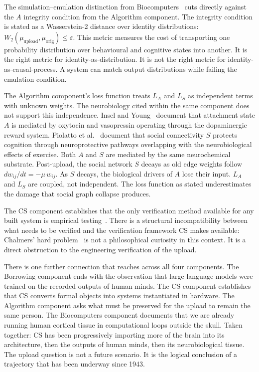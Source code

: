 \documentclass[12pt, a4paper]{article}
\begin{document}
The simulation--emulation distinction from Biocomputers~\cite{Bio-8} cuts directly against the $A$
integrity condition from the Algorithm component. The integrity condition is stated as a
Wasserstein-2 distance over identity distributions: $W_2(\mu_{\mathrm{upload}},\mu_{\mathrm{orig}})
\leq \varepsilon$. This metric measures the cost of transporting one probability distribution over
behavioural and cognitive states into another. It is the right metric for identity-as-distribution.
It is not the right metric for identity-as-causal-process. A system can match output distributions
while failing the emulation condition.

The Algorithm component's loss function treats $L_A$ and $L_S$ as independent terms with unknown
weights. The neurobiology cited within the same component does not support this independence. Insel
and Young~\cite{Alg-2} document that attachment state $A$ is mediated by oxytocin and vasopressin
operating through the dopaminergic reward system. Piolatto et al.~\cite{Alg-10} document that social
connectivity $S$ protects cognition through neuroprotective pathways overlapping with the
neurobiological effects of exercise. Both $A$ and $S$ are mediated by the same neurochemical
substrate. Post-upload, the social network $S$ decays as old edge weights follow $dw_{ij}/dt =
-\mu\,w_{ij}$. As $S$ decays, the biological drivers of $A$ lose their input. $L_A$ and $L_S$ are
coupled, not independent. The loss function as stated underestimates the damage that social graph
collapse produces.

The CS component establishes that the only verification method available for any built system is
empirical testing~\cite{Bor-6}. There is a structural incompatibility between what needs to be
verified and the verification framework CS makes available: Chalmers' hard problem~\cite{Alg-7} is
not a philosophical curiosity in this context. It is a direct obstruction to the engineering
verification of the upload.

There is one further connection that reaches across all four components. The Borrowing component ends
with the observation that large language models were trained on the recorded outputs of human minds.
The CS component establishes that CS converts formal objects into systems instantiated in hardware.
The Algorithm component asks what must be preserved for the upload to remain the same person. The
Biocomputers component documents that we are already running human cortical tissue in computational
loops outside the skull. Taken together: CS has been progressively importing more of the brain into
its architecture, then the outputs of human minds, then its neurobiological tissue. The upload
question is not a future scenario. It is the logical conclusion of a trajectory that has been
underway since 1943.
\end{document}
